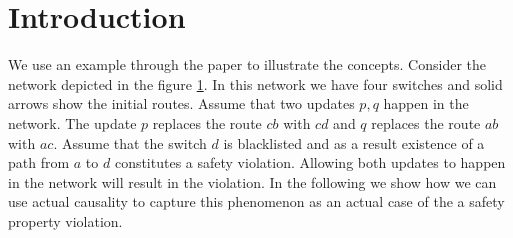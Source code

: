 \section{Introduction}
We use an example through the paper to illustrate 
the concepts.
Consider the network depicted in the figure \ref{fig:blacklist}.
In this network we have four switches and solid arrows show 
the initial routes.
Assume that two updates $p,q$ happen in the network.
The update $p$ replaces the route $cb$ with $cd$ and 
$q$ replaces the route $ab$ with $ac$.
Assume that the switch $d$ is blacklisted and as a result
existence of a path from $a$ to $d$ constitutes a safety 
violation.
Allowing both updates to happen in the network will result in the violation. 
In the following we show how we can use actual causality  
to capture this phenomenon as an actual case of the 
a safety property violation.

\begin{figure}
    \centering
    \caption{}
    \label{fig:blacklist}
\end{figure}